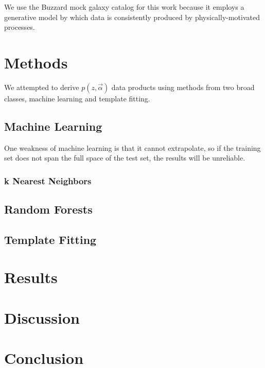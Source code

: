 \documentclass[12pt, preprint]{aastex}
\begin{document}
We use the Buzzard mock galaxy catalog for this work because it employs a generative model by which data is consistently produced by physically-motivated processes.

\section{Methods}

We attempted to derive $p(z,\vec{\alpha})$ data products using methods from two broad classes, machine learning and template fitting.

\subsection{Machine Learning}

One weakness of machine learning is that it cannot extrapolate, so if the training set does not span the full space of the test set, the results will be unreliable.

\subsubsection{k Nearest Neighbors}

\subsection{Random Forests}

\subsection{Template Fitting}

\section{Results}

\section{Discussion}

\section{Conclusion}
\end{document}
